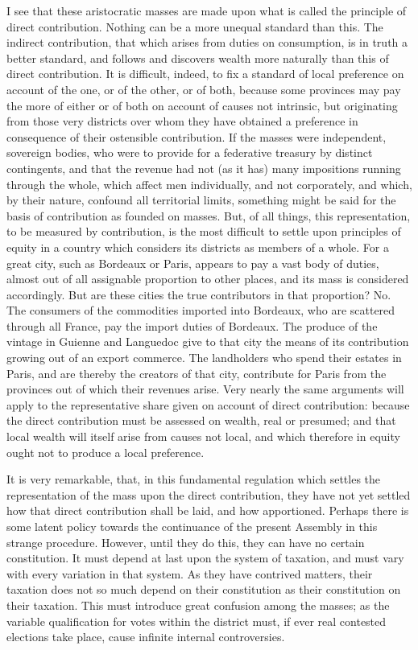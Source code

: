I see that these aristocratic masses are made upon what is called the principle of direct contribution. Nothing can be a more unequal standard than this. The indirect contribution, that which arises from duties on consumption, is in truth a better standard, and follows and discovers wealth more naturally than this of direct contribution. It is difficult, indeed, to fix a standard of local preference on account of the one, or of the other, or of both, because some provinces may pay the more of either or of both on account of causes not intrinsic, but originating from those very districts over whom they have obtained a preference in consequence of their ostensible contribution. If the masses were independent, sovereign bodies, who were to provide for a federative treasury by distinct contingents, and that the revenue had not (as it has) many impositions running through the whole, which affect men individually, and not corporately, and which, by their nature, confound all territorial limits, something might be said for the basis of contribution as founded on masses. But, of all things, this representation, to be measured by contribution, is the most difficult to settle upon principles of equity in a country which considers its districts as members of a whole. For a great city, such as Bordeaux or Paris, appears to pay a vast body of duties, almost out of all assignable proportion to other places, and its mass is considered accordingly. But are these cities the true contributors in that proportion? No. The consumers of the commodities imported into Bordeaux, who are scattered through all France, pay the import duties of Bordeaux. The produce of the vintage in Guienne and Languedoc give to that city the means of its contribution growing out of an export commerce. The landholders who spend their estates in Paris, and are thereby the creators of that city, contribute for Paris from the provinces out of which their revenues arise. Very nearly the same arguments will apply to the representative share given on account of direct contribution: because the direct contribution must be assessed on wealth, real or presumed; and that local wealth will itself arise from causes not local, and which therefore in equity ought not to produce a local preference.

It is very remarkable, that, in this fundamental regulation which settles the representation of the mass upon the direct contribution, they have not yet settled how that direct contribution shall be laid, and how apportioned. Perhaps there is some latent policy towards the continuance of the present Assembly in this strange procedure. However, until they do this, they can have no certain constitution. It must depend at last upon the system of taxation, and must vary with every variation in that system. As they have contrived matters, their taxation does not so much depend on their constitution as their constitution on their taxation. This must introduce great confusion among the masses; as the variable qualification for votes within the district must, if ever real contested elections take place, cause infinite internal controversies.

